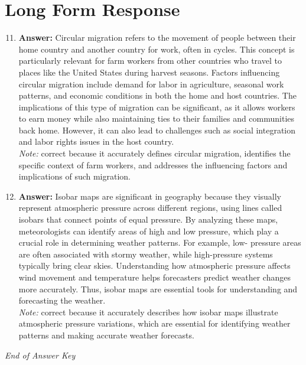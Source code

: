 \documentclass[12pt]{article}
\begin{document}
\section*{Long Form Response}
\begin{enumerate}[label=\arabic*.]
\setcounter{enumi}{10}
\item \textbf{Answer:} Circular migration refers to the movement of people between their home country and another country for work, often in cycles. This concept is particularly relevant for farm workers from other countries who travel to places like the United States during harvest seasons. Factors influencing circular migration include demand for labor in agriculture, seasonal work patterns, and economic conditions in both the home and host countries. The implications of this type of migration can be significant, as it allows workers to earn money while also maintaining ties to their families and communities back home. However, it can also lead to challenges such as social integration and labor rights issues in the host country.
\\ \textit{Note:} correct because it accurately defines circular migration, identifies the specific context of farm workers, and addresses the influencing factors and implications of such migration.
\item \textbf{Answer:} Isobar maps are significant in geography because they visually represent atmospheric pressure across different regions, using lines called isobars that connect points of equal pressure. By analyzing these maps, meteorologists can identify areas of high and low pressure, which play a crucial role in determining weather patterns. For example, low- pressure areas are often associated with stormy weather, while high-pressure systems typically bring clear skies. Understanding how atmospheric pressure affects wind movement and temperature helps forecasters predict weather changes more accurately. Thus, isobar maps are essential tools for understanding and forecasting the weather.
\\ \textit{Note:} correct because it accurately describes how isobar maps illustrate atmospheric pressure variations, which are essential for identifying weather patterns and making accurate weather forecasts.
\end{enumerate}

\vfill
\noindent\textit{End of Answer Key}
\end{document}
